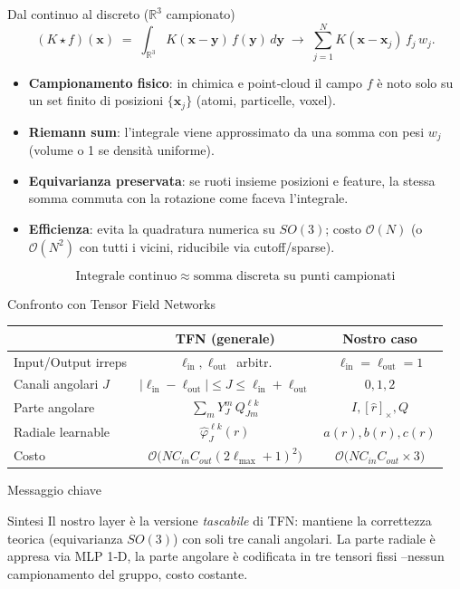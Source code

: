 \documentclass[aspectratio=64,8pt]{beamer}
\begin{document}
\begin{frame}[fragile]{Dal continuo al discreto \;(\(\mathbb R^3\) campionato)}
\[
( K\!\star f )(\mathbf x)
\;=\;\int_{\mathbb R^3}\!K(\mathbf x-\mathbf y)\,f(\mathbf y)\,d\mathbf y
\;\longrightarrow\;
\sum_{j=1}^{N} K(\mathbf x-\mathbf x_j)\,f_j\,w_j.
\]
\begin{itemize}
  \item \textbf{Campionamento fisico}: in chimica e point‑cloud il campo \(f\) è noto solo su un set finito di posizioni \(\{\mathbf x_j\}\) (atomi, particelle, voxel).
  \item \textbf{Riemann sum}: l'integrale viene approssimato da una somma con pesi \(w_j\) (volume o 1 se densità uniforme).
  \item \textbf{Equivarianza preservata}: se ruoti insieme posizioni e feature, la stessa somma commuta con la rotazione come faceva l'integrale.
  \item \textbf{Efficienza}: evita la quadratura numerica su \(SO(3)\); costo \(\mathcal O(N)\) (o \(\mathcal O(N^2)\) con tutti i vicini, riducibile via cutoff/sparse).
\end{itemize}
\[
\boxed{\text{Integrale continuo}\;\approx\;\text{somma discreta su punti campionati}}
\]
\end{frame}



\begin{frame}[fragile]{Confronto con Tensor Field Networks}
\begin{tabular}{|l|c|c|}
\hline
 & \textbf{TFN (generale)} & \textbf{Nostro caso}\tabularnewline\hline
Input/Output irreps & \(\ell_{\text{in}},\ell_{\text{out}}\,\) arbitr. & \(\ell_{\text{in}}=\ell_{\text{out}}=1\)\\\hline
Canali angolari \(J\) & \(|\ell_{\text{in}}-\ell_{\text{out}}|\le J\le\ell_{\text{in}}+\ell_{\text{out}}\) & \(0,1,2\)\\\hline
Parte angolare & \(\displaystyle\sum_{m}Y^m_J\,Q_{Jm}^{\ell k}\) & \(I,[\hat r]_\times,Q\)\\\hline
Radiale learnable & \(\hat\varphi^{\ell k}_J(r)\) & \(a(r),b(r),c(r)\)\\\hline
Costo & \(\mathcal O\big(NC_{in}C_{out}(2\ell_{\max}+1)^2\big)\) & \(\mathcal O\big(NC_{in}C_{out}\times3\big)\)\\\hline
\end{tabular}
\end{frame}

\begin{frame}[fragile]{Messaggio chiave}
\begin{block}{Sintesi}
  Il nostro layer è la versione \emph{tascabile} di TFN: mantiene la correttezza teorica (equivarianza \(SO(3)\)) con soli tre canali angolari. La parte radiale è appresa via MLP 1‑D, la parte angolare è codificata in tre tensori fissi –\;nessun campionamento del gruppo, costo costante.
\end{block}
\end{frame}
\end{document}
